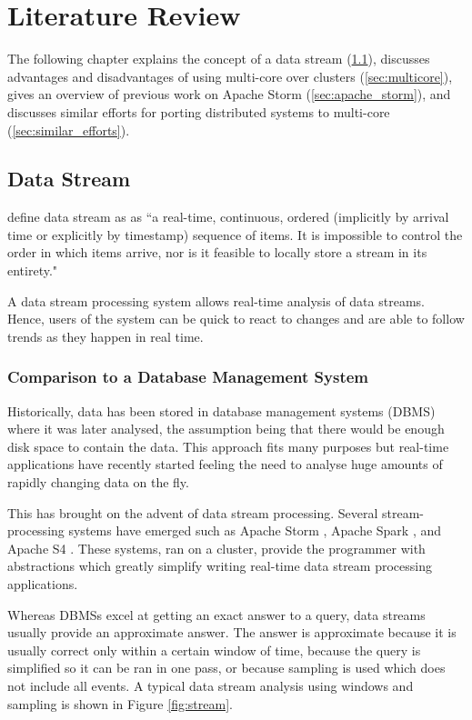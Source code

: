 \documentclass[bsc,deptreport,twoside,singlespacing,normalheadings,parskip]{infthesis}\usepackage[]{graphicx}\usepackage[]{color}
\begin{document}
\clearpage{}\chapter{Literature Review}

The following chapter explains the concept of a data stream (\ref{sec:data_stream}), discusses advantages and disadvantages of using multi-core over clusters (\ref{sec:multicore}), gives an overview of previous work on Apache Storm (\ref{sec:apache_storm}), and discusses similar efforts for porting distributed systems to multi-core (\ref{sec:similar_efforts}).

\section{Data Stream}
\label{sec:data_stream}

\textcite{golab2003issues} define data stream as as ``a real-time, continuous, ordered (implicitly by arrival time or explicitly by timestamp) sequence of items. It is impossible to control the order in which items arrive, nor is it feasible to locally store a stream in its entirety."

A data stream processing system allows real-time analysis of data streams. Hence, users of the system can be quick to react to changes and are able to follow trends as they happen in real time.

\subsection{Comparison to a Database Management System}

Historically, data has been stored in database management systems (DBMS) where it was later analysed, the assumption being that there would be enough disk space to contain the data. This approach fits many purposes but real-time applications have recently started feeling the need to analyse huge amounts of rapidly changing data on the fly.

This has brought on the advent of data stream processing. Several stream-processing systems have emerged such as Apache Storm \citep{ApacheStorm}, Apache Spark \citep{ApacheSpark}, and Apache S4 \citep{YahooS4}. These systems, ran on a cluster, provide the programmer with abstractions which greatly simplify writing real-time data stream processing applications.

Whereas DBMSs excel at getting an exact answer to a query, data streams usually provide an approximate answer. The answer is approximate because it is usually correct only within a certain window of time, because the query is simplified so it can be ran in one pass, or because sampling is used which does not include all events. A typical data stream analysis using windows and sampling is shown in Figure \ref{fig:stream}.
\end{document}
